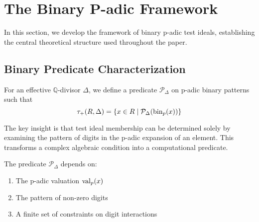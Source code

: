 \section{The Binary P-adic Framework}\label{sec:binary_framework}

In this section, we develop the framework of binary p-adic test ideals, establishing the central theoretical structure used throughout the paper.

\subsection{Binary Predicate Characterization}

\begin{definition}\label{def:binary-predicate}
For an effective $\mathbb{Q}$-divisor $\Delta$, we define a predicate $\mathcal{P}_\Delta$ on p-adic binary patterns such that
$$\tau_+(R,\Delta) = \{x \in R \mid \mathcal{P}_\Delta(\operatorname{bin}_p(x))\}$$
\end{definition}

The key insight is that test ideal membership can be determined solely by examining the pattern of digits in the p-adic expansion of an element. This transforms a complex algebraic condition into a computational predicate.

\begin{lemma}\label{lem:predicate-structure}
The predicate $\mathcal{P}_\Delta$ depends on:
\begin{enumerate}
    \item The p-adic valuation $\operatorname{val}_p(x)$
    \item The pattern of non-zero digits
    \item A finite set of constraints on digit interactions
\end{enumerate}
\end{lemma}


